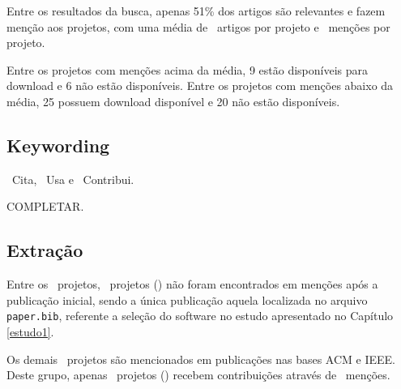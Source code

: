 Entre os resultados da busca, apenas 51\% dos artigos são relevantes e fazem
menção aos projetos, com uma média de \ScreeningUniqueMean \ artigos por projeto
e \ScreeningMean \ menções por projeto.

Entre os projetos com menções acima da média, 9 estão disponíveis para download
e 6 não estão disponíveis. Entre os projetos com menções abaixo da média, 25
possuem download disponível e 20 não estão disponíveis.



\subsection{Keywording}

\CiteCount \ Cita,
\UseCount \ Usa e
\ContributeCount \ Contribui.

COMPLETAR.

\subsection{Extração}

Entre os \SoftwareCount \ projetos, \SoftwareNotMentionedCount \ projetos
() não foram encontrados em menções
após a publicação inicial, sendo a única publicação aquela localizada no
arquivo \texttt{paper.bib}, referente a seleção do software no estudo
apresentado no Capítulo \ref{estudo1}.

Os demais \MentionsStudyDois \ projetos são mencionados em publicações nas
bases ACM e IEEE. Deste grupo, apenas \ContributeStudyDoisSoftware \ projetos
() recebem contribuições através de
\ContributeStudyDoisCount \ menções.

